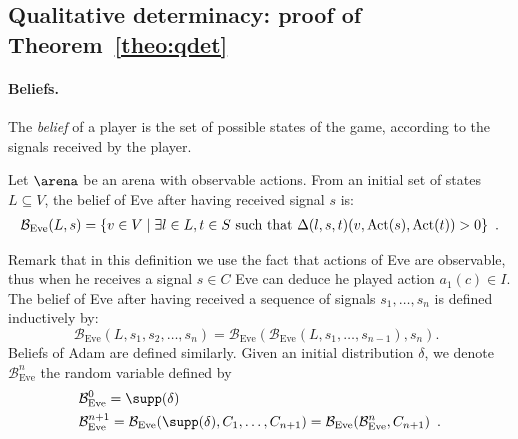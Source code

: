 \subsection{Qualitative determinacy: proof of Theorem~\ref{theo:qdet}}

\paragraph{Beliefs.}
The
\emph{belief} of a player
is the set of possible states of the game, according
to the signals received by the player. 

\newcommand{\states}{V}
\newcommand{\ar}{\arena}
\newcommand{\action}{a}
\newcommand{\belun}{\mathcal{B}_{\text{Eve}}}
\newcommand{\beldeux}{\mathcal{B}_{\text{Adam}}}
\newcommand{\deuxbelun}{\mathcal{B}^{(2)}_{Eve}}
\newcommand{\tp}{\Delta}
\newcommand{\parties}[1]{\ensuremath{\mathcal{P}(#1)}}

\begin{definition}[Belief]
{Let $\arena$ be an arena with observable actions.}
  From an initial set of states $L\subseteq\states$, the belief of
  Eve after having received signal $s$ is:
  \begin{multline*}
\belun(L,s) =
 \{ v\in\states \mid \exists l\in L, t\in S \text{ such that } \tp(l,s,t)(v,\Act(s),\Act(t))>0\}\enspace.  
  \end{multline*}

Remark that in this definition we use the fact that actions of Eve are observable,
thus when he receives a signal $s\in C$ Eve can deduce he played action
$\action_1(c)\in I$.
The belief of Eve after having received a sequence of signals $s_1,\ldots,s_n$ is defined inductively by:
\[
\belun(L,s_1,s_2,\ldots,s_n)
 = \belun(\belun(L,s_1,\ldots,s_{n-1}),s_n).\enspace
\]
Beliefs of Adam are defined similarly.
{
Given an initial distribution $\delta$,
we denote
$\belun^n$ the random variable defined by}
\begin{align*}
&{\belun^{0} = \supp(\delta)}\\
&{\belun^{n+1} =\belun(\supp(\delta),C_1,\ldots,C_{n+1})
= \belun(\belun^n,C_{n+1})
\enspace.}
\end{align*}
\end{definition}



